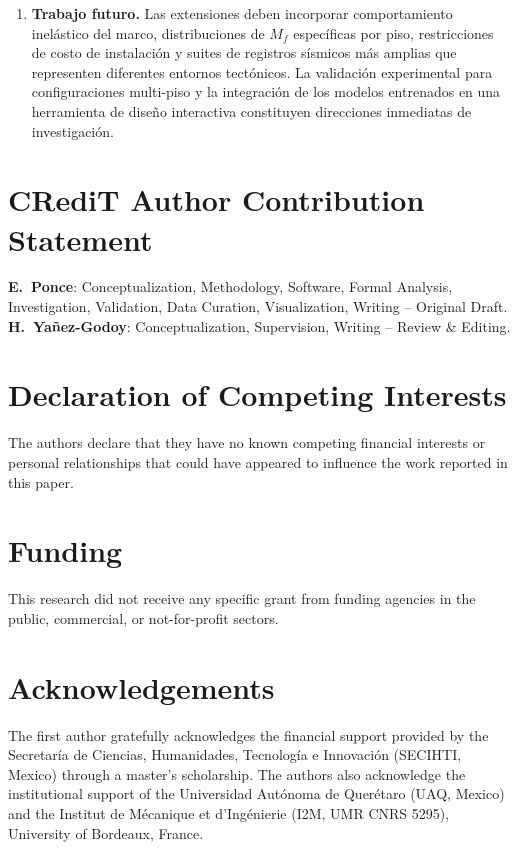 \documentclass[preprint,12pt,authoryear]{elsarticle}
\newcommand{\Mf}{M_{\!f}}
\begin{document}
\begin{enumerate}
\item \textbf{Trabajo futuro.}
Las extensiones deben incorporar comportamiento inelástico del marco,
distribuciones de $\Mf$ específicas por piso, restricciones de costo de
instalación y suites de registros sísmicos más amplias que representen diferentes
entornos tectónicos. La validación experimental para configuraciones multi-piso
y la integración de los modelos entrenados en una herramienta de diseño
interactiva constituyen direcciones inmediatas de investigación.

\end{enumerate}

\section*{CRediT Author Contribution Statement}

\textbf{E.~Ponce}: Conceptualization, Methodology, Software, Formal Analysis,
Investigation, Validation, Data Curation, Visualization, Writing -- Original Draft.
\textbf{H.~Yañez-Godoy}: Conceptualization, Supervision, Writing -- Review \& Editing.

\section*{Declaration of Competing Interests}

The authors declare that they have no known competing financial interests or
personal relationships that could have appeared to influence the work reported
in this paper.

\section*{Funding}

This research did not receive any specific grant from funding agencies in the
public, commercial, or not-for-profit sectors.

\section*{Acknowledgements}

The first author gratefully acknowledges the financial support provided by the
Secretaría de Ciencias, Humanidades, Tecnología e Innovación (SECIHTI, Mexico)
through a master's scholarship. The authors also acknowledge the institutional
support of the Universidad Autónoma de Querétaro (UAQ, Mexico) and the Institut
de Mécanique et d'Ingénierie (I2M, UMR CNRS 5295), University of Bordeaux,
France.
\end{document}
